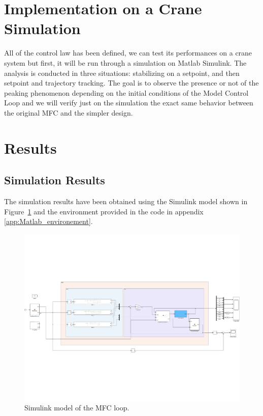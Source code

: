 \section{Implementation on a Crane Simulation}
All of the control law has been defined, we can test its performances on a crane system but first, it will be run through a simulation on Matlab Simulink. 
The analysis is conducted in three situations: stabilizing on a setpoint, and then setpoint and trajectory tracking. The goal is to observe the presence or not of the peaking phenomenon depending on the initial conditions of the Model Control Loop and we will verify just on the simulation the exact same behavior between the original MFC and the simpler design.



\section{Results}
\subsection{Simulation Results}

The simulation results have been obtained using the Simulink model shown in Figure~\ref{fig:Simulink_MFC_Loop} and 
the environment provided in the code in appendix \ref{app:Matlab_environement}.


\begin{figure}[htbp]
    \centering
    \includegraphics[width=0.9\linewidth]{imgs/section1/MFC_efficient_model.pdf}
    \caption{Simulink model of the MFC loop.}
    \label{fig:Simulink_MFC_Loop}
\end{figure}

